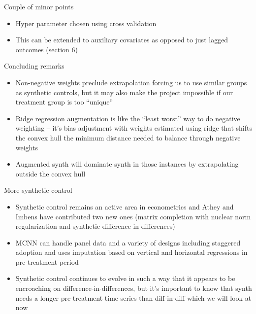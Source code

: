 \documentclass{beamer}
\begin{document}


\begin{frame}{Couple of minor points}

\begin{itemize}
\item Hyper parameter chosen using cross validation
\item This can be extended to auxiliary covariates as opposed to just lagged outcomes (section 6)
\end{itemize}

\end{frame}



\begin{frame}{Concluding remarks}

\begin{itemize}
\item Non-negative weights preclude extrapolation forcing us to use similar groups as synthetic controls, but it may also make the project impossible if our treatment group is too ``unique'' 
\item Ridge regression augmentation is like the ``least worst'' way to do negative weighting -- it's bias adjustment with weights estimated using ridge that shifts the convex hull the minimum distance needed to balance through negative weights
\item Augmented synth will dominate synth in those instances by extrapolating outside the convex hull
\end{itemize}

\end{frame}

\begin{frame}{More synthetic control}

\begin{itemize}

\item Synthetic control remains an active area in econometrics and Athey and Imbens have contributed two new ones (matrix completion with nuclear norm regularization and synthetic difference-in-differences)
\item MCNN can handle panel data and a variety of designs including staggered adoption and uses imputation based on vertical and horizontal regressions in pre-treatment period
\item Synthetic control continues to evolve in such a way that it appears to be encroaching on difference-in-differences, but it's important to know that synth needs a longer pre-treatment time series than diff-in-diff which we will look at now
\end{itemize}

\end{frame}
\end{document}
